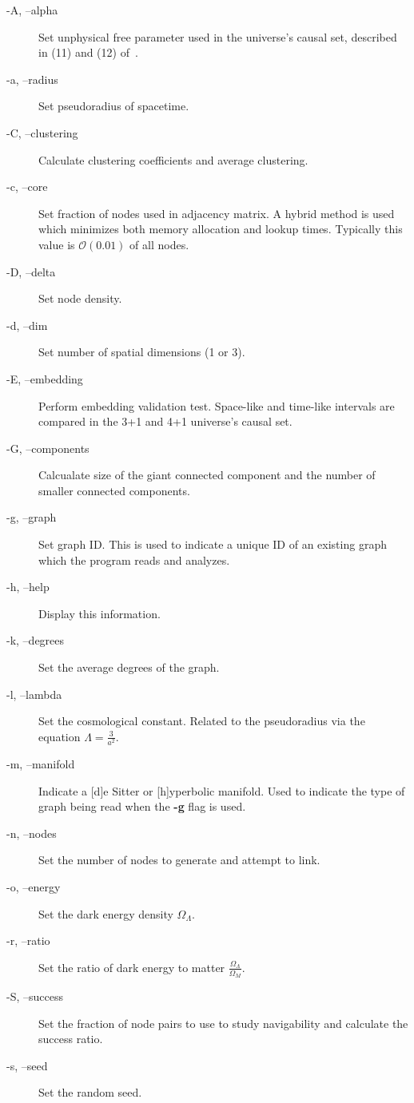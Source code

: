 \documentclass[preprint,notitlepage,amsmath,amssymb,floatfix]{revtex4-1}
\begin{document}
\begin{description}
  \item[-A, --alpha] \tab Set unphysical free parameter used in the universe's causal set, described in (11) and (12) of~\cite{ref:snc2012}.
  \item[-a, --radius] \tab Set pseudoradius of spacetime.
  \item[-C, --clustering] \tab Calculate clustering coefficients and average clustering.
  \item[-c, --core] \tab Set fraction of nodes used in adjacency matrix.  
A hybrid method is used which minimizes both memory allocation and lookup times.
Typically this value is $\mathcal{O}(0.01)$ of all nodes.
  \item[-D, --delta] \tab Set node density.
  \item[-d, --dim] \tab Set number of spatial dimensions (1 or 3).
  \item[-E, --embedding] \tab Perform embedding validation test.  Space-like and time-like intervals are compared in the 3+1 and 4+1 universe's causal set.
  \item[-G, --components] \tab Calcualate size of the giant connected component and the number of smaller connected components.
  \item[-g, --graph] \tab Set graph ID.  
This is used to indicate a unique ID of an existing graph which the program reads and analyzes.
  \item[-h, --help] \tab Display this information.
  \item[-k, --degrees] \tab Set the average degrees of the graph.
  \item[-l, --lambda] \tab Set the cosmological constant.  
Related to the pseudoradius via the equation $\Lambda = \frac{3}{a^2}$.
  \item[-m, --manifold] \tab Indicate a [d]e Sitter or [h]yperbolic manifold.  Used to indicate the type of graph being read when the \textbf{-g} flag is used.
  \item[-n, --nodes] \tab Set the number of nodes to generate and attempt to link.
  \item[-o, --energy] \tab Set the dark energy density $\Omega_\Lambda$.
  \item[-r, --ratio] \tab Set the ratio of dark energy to matter $\frac{\Omega_\Lambda}{\Omega_M}$.
  \item[-S, --success] \tab Set the fraction of node pairs to use to study navigability and calculate the success ratio.
  \item[-s, --seed] \tab Set the random seed.

\end{description}
\end{document}
